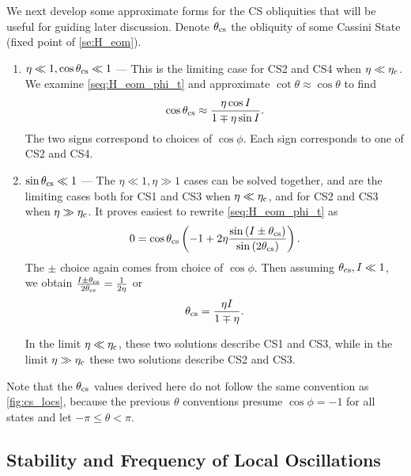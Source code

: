 \documentclass[
        fleqn,
        usenatbib,
        referee,
    ]{mnras}
\newcommand*{\p}[1]{\left(#1\right)}
\begin{document}
We next develop some approximate forms for the CS obliquities that will be
useful for guiding later discussion. Denote $\theta_{\rm cs}$ the obliquity of
some Cassini State (fixed point of \autoref{se:H_eom}).
\begin{enumerate}
    \item $\eta \ll 1, \cos \theta_{\rm cs} \ll 1$ --- This is the limiting case
        for CS2 and CS4 when $\eta \ll \eta_{\rm c}$. We examine
        \autoref{seq:H_eom_phi_t} and approximate $\cot \theta \approx \cos
        \theta$ to find
        \begin{equation}
            \cos \theta_{\rm cs} \approx \frac{\eta \cos I}
                {1 \mp \eta \sin I}.
        \end{equation}
        The two signs correspond to choices of $\cos \phi$. Each sign
        corresponds to one of CS2 and CS4.

    \item $\sin \theta_{\rm cs} \ll 1$ --- The $\eta \ll 1, \eta \gg 1$ cases
        can be solved together, and are the limiting cases both for CS1 and CS3
        when $\eta \ll \eta_{\rm c}$, and for CS2 and CS3 when $\eta \gg
        \eta_{\rm c}$. It proves easiest to rewrite \autoref{seq:H_eom_phi_t} as
        \begin{equation}
            0 = \cos \theta_{\rm cs}\p{-1 + 2\eta
                \frac{\sin \p{I \pm \theta_{\rm cs}}}{\sin \p{2\theta_{\rm
                    cs}}}}.\label{eq:rewritten_dphi}
        \end{equation}
        The $\pm$ choice again comes from choice of $\cos \phi$. Then assuming
        $\theta_{\rm cs}, I \ll 1$, we obtain $\frac{I \pm
        \theta_{\rm cs}}{2\theta_{\rm cs}} = \frac{1}{2\eta}$ or
        \begin{equation}
            \theta_{\rm cs} = \frac{\eta I}{1 \mp \eta}.
        \end{equation}

        In the limit $\eta \ll \eta_{\rm c}$, these two solutions describe CS1
        and CS3, while in the limit $\eta \gg \eta_{\rm c}$ these two solutions
        describe CS2 and CS3.
\end{enumerate}
Note that the $\theta_{\rm cs}$ values derived here do not follow the same
convention as \autoref{fig:cs_locs}, because the previous $\theta$ conventions
presume $\cos \phi = -1$ for all states and let $-\pi \leq \theta < \pi$.

\subsection{Stability and Frequency of Local Oscillations}\label{ss:eigens}
\end{document}
